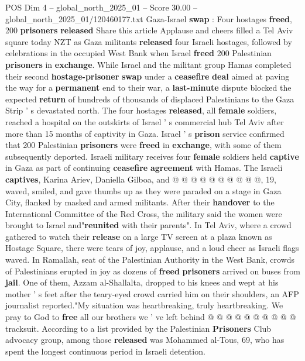 \begin{textsample}{POS Dim 4 – global\_north\_2025\_01 – Score 30.00 – global\_north\_2025\_01/120460177.txt}  \label{ex:f4_pos_050}
Gaza-Israel \textbf{swap} : Four hostages \textbf{freed}, 200 \textbf{prisoners} \textbf{released} Share this article Applause and cheers filled a Tel Aviv square today NZT as Gaza militants \textbf{released} four Israeli hostages, followed by celebrations in the occupied West Bank when Israel \textbf{freed} 200 Palestinian \textbf{prisoners} in \textbf{exchange}.
While Israel and the militant group Hamas completed their second \textbf{hostage-prisoner} \textbf{swap} under a \textbf{ceasefire} \textbf{deal} aimed at paving the way for a \textbf{permanent} end to their war, a \textbf{last-minute} dispute blocked the expected \textbf{return} of hundreds of thousands of displaced Palestinians to the Gaza Strip ' s devastated north.
The four hostages \textbf{released}, all \textbf{female} soldiers, reached a hospital on the outskirts of Israel ' s commercial hub Tel Aviv after more than 15 months of captivity in Gaza.
Israel ' s \textbf{prison} service confirmed that 200 Palestinian \textbf{prisoners} were \textbf{freed} in \textbf{exchange}, with some of them subsequently deported.
Israeli military receives four \textbf{female} soldiers held \textbf{captive} in Gaza as part of continuing \textbf{ceasefire} \textbf{agreement} with Hamas.
The Israeli \textbf{captives}, Karina Ariev, Daniella Gilboa, and @ @ @ @ @ @ @ @ @ @, 19, waved, smiled, and gave thumbs up as they were paraded on a stage in Gaza City, flanked by masked and armed militants.
After their \textbf{handover} to the International Committee of the Red Cross, the military said the women were brought to Israel and"\textbf{reunited} with their parents".
In Tel Aviv, where a crowd gathered to watch their \textbf{release} on a large TV screen at a plaza known as Hostage Square, there were tears of joy, applause, and a loud cheer as Israeli flags waved.
In Ramallah, seat of the Palestinian Authority in the West Bank, crowds of Palestinians erupted in joy as dozens of \textbf{freed} \textbf{prisoners} arrived on buses from \textbf{jail}.
One of them, Azzam al-Shallalta, dropped to his knees and wept at his mother ' s feet after the teary-eyed crowd carried him on their shoulders, an AFP journalist reported."My situation was heartbreaking, truly heartbreaking.
We pray to God to \textbf{free} all our brothers we ' ve left behind @ @ @ @ @ @ @ @ @ @ tracksuit.
According to a list provided by the Palestinian \textbf{Prisoners} Club advocacy group, among those \textbf{released} was Mohammed al-Tous, 69, who has spent the longest continuous period in Israeli detention.

\end{textsample}
